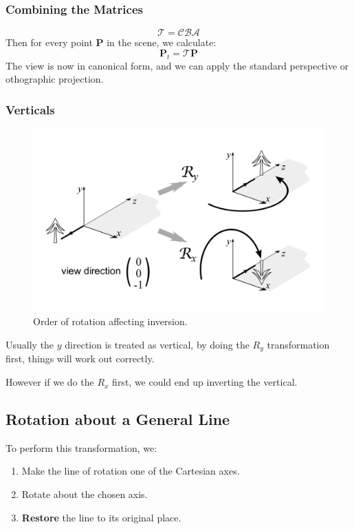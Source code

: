 \documentclass[11pt]{article}
\begin{document}
\subsubsection{Combining the Matrices}
\[
  \mathcal{T} = \mathcal{CBA}  
\]
Then for every point $\textbf{P}$ in the scene, we calculate:
\[
  \textbf{P}_t = \mathcal{T}\textbf{P}  
\]
The view is now in canonical form, and we can apply the standard perspective or othographic projection.

\subsubsection{Verticals}
\begin{figure}[htb!]
  \caption{Order of rotation affecting inversion.}
  \includegraphics[scale=0.2]{invert}
  \centering
\end{figure}

Usually the $y$ direction is treated as vertical, by doing the $R_y$ transformation first, things will work out correctly.

However if we do the $R_x$ first, we could end up inverting the vertical.

\subsection{Rotation about a General Line}
To perform this transformation, we:
\begin{enumerate}
  \item Make the line of rotation one of the Cartesian axes.
  \item Rotate about the chosen axis.
  \item \textbf{Restore} the line to its original place.
\end{enumerate}
\end{document}
